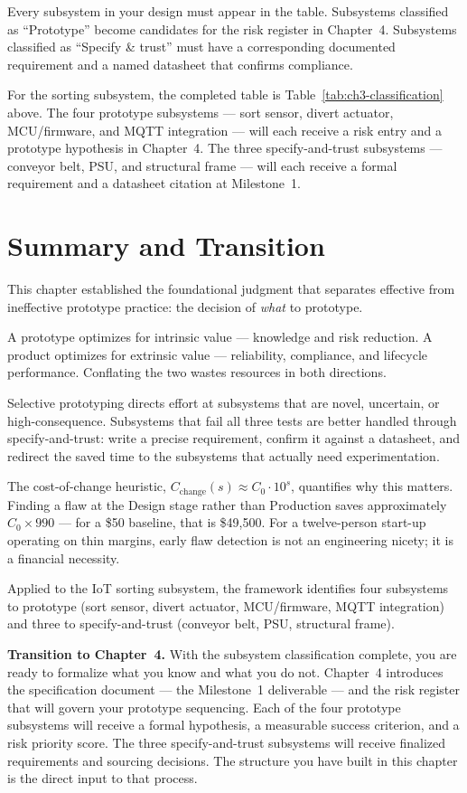 Every subsystem in your design must appear in the table.
Subsystems classified as ``Prototype'' become candidates for the risk register
in Chapter~4.
Subsystems classified as ``Specify \& trust'' must have a corresponding
documented requirement and a named datasheet that confirms compliance.

For the sorting subsystem, the completed table is
Table~\ref{tab:ch3-classification} above.
The four prototype subsystems --- sort sensor, divert actuator, MCU/firmware,
and MQTT integration --- will each receive a risk entry and a prototype
hypothesis in Chapter~4.
The three specify-and-trust subsystems --- conveyor belt, PSU, and structural
frame --- will each receive a formal requirement and a datasheet citation at
Milestone~1.


\section*{Summary and Transition}
\label{sec:ch3-summary}

This chapter established the foundational judgment that separates effective
from ineffective prototype practice: the decision of \emph{what} to prototype.

A prototype optimizes for intrinsic value --- knowledge and risk reduction.
A product optimizes for extrinsic value --- reliability, compliance, and
lifecycle performance.
Conflating the two wastes resources in both directions.

Selective prototyping directs effort at subsystems that are novel, uncertain,
or high-consequence.
Subsystems that fail all three tests are better handled through
specify-and-trust: write a precise requirement, confirm it against a datasheet,
and redirect the saved time to the subsystems that actually need
experimentation.

The cost-of-change heuristic, $C_{\text{change}}(s) \approx C_0 \cdot 10^s$,
quantifies why this matters.
Finding a flaw at the Design stage rather than Production saves approximately
$C_0 \times 990$ --- for a \$50 baseline, that is \$49{,}500.
For a twelve-person start-up operating on thin margins, early flaw detection is
not an engineering nicety; it is a financial necessity.

Applied to the IoT sorting subsystem, the framework identifies four subsystems
to prototype (sort sensor, divert actuator, MCU/firmware, MQTT integration) and
three to specify-and-trust (conveyor belt, PSU, structural frame).

\medskip
\noindent\textbf{Transition to Chapter~4.}
With the subsystem classification complete, you are ready to formalize what you
know and what you do not.
Chapter~4 introduces the specification document --- the Milestone~1 deliverable
--- and the risk register that will govern your prototype sequencing.
Each of the four prototype subsystems will receive a formal hypothesis, a
measurable success criterion, and a risk priority score.
The three specify-and-trust subsystems will receive finalized requirements and
sourcing decisions.
The structure you have built in this chapter is the direct input to that
process.
